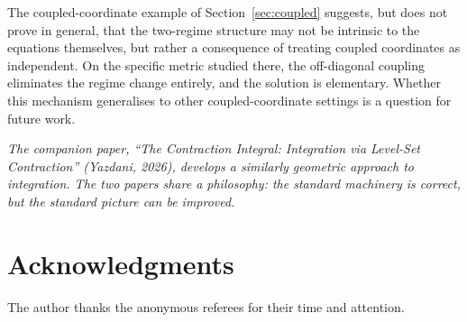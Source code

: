\documentclass{amsart}
\theoremstyle{definition}
\theoremstyle{remark}
\begin{document}
The coupled-coordinate example of Section~\ref{sec:coupled} suggests, but does not prove in general, that the two-regime structure may not be intrinsic to the equations themselves, but rather a consequence of treating coupled coordinates as independent. On the specific metric studied there, the off-diagonal coupling eliminates the regime change entirely, and the solution is elementary. Whether this mechanism generalises to other coupled-coordinate settings is a question for future work.

\bigskip

\noindent\textit{The companion paper, ``The Contraction Integral: Integration via Level-Set Contraction'' (Yazdani, 2026), develops a similarly geometric approach to integration. The two papers share a philosophy: the standard machinery is correct, but the standard picture can be improved.}

\section*{Acknowledgments}

The author thanks the anonymous referees for their time and attention.

\newpage
\end{document}
